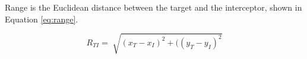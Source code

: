 \documentclass[conference]{IEEEtran}
\providecommand{\DIFdelbegin}{} %
\providecommand{\DIFdelend}{} %
\newcommand{\DIFscaledelfig}{0.5}
\newlength{\DIFdelgraphicswidth} %
\newlength{\DIFdelgraphicsheight} %
\newcommand{\DIFdelincludegraphics}[2][]{%
\sbox{\DIFdelgraphicsbox}{\DIFOincludegraphics[#1]{#2}}%
\settoboxwidth{\DIFdelgraphicswidth}{\DIFdelgraphicsbox} %
\settoboxtotalheight{\DIFdelgraphicsheight}{\DIFdelgraphicsbox} %
\scalebox{\DIFscaledelfig}{%
\parbox[b]{\DIFdelgraphicswidth}{\usebox{\DIFdelgraphicsbox}\\[-\baselineskip] \rule{\DIFdelgraphicswidth}{0em}}\llap{\resizebox{\DIFdelgraphicswidth}{\DIFdelgraphicsheight}{%
\setlength{\unitlength}{\DIFdelgraphicswidth}%
\begin{picture}(1,1)%
\thicklines\linethickness{2pt} %
{\color[rgb]{1,0,0}\put(0,0){\framebox(1,1){}}}%
{\color[rgb]{1,0,0}\put(0,0){\line( 1,1){1}}}%
{\color[rgb]{1,0,0}\put(0,1){\line(1,-1){1}}}%
\end{picture}%
}\hspace*{3pt}}} %
} %
\DeclareRobustCommand{\DIFdelbegin}{\DIFOdelbegin \let\includegraphics\DIFdelincludegraphics} %
\DeclareRobustCommand{\DIFdelend}{\DIFOaddend \let\includegraphics\DIFOincludegraphics} %
\begin{document}
\DIFdelend Range is the Euclidean distance between the target and the interceptor, shown in Equation \ref{eq:range}. 

\begin{equation} \label{eq:range}
R_{TI} =\sqrt[]{(x_T - x_I)^2+((y_T - y_I)^2}
\end{equation}


 


\DIFdelbegin %



\end{document}
